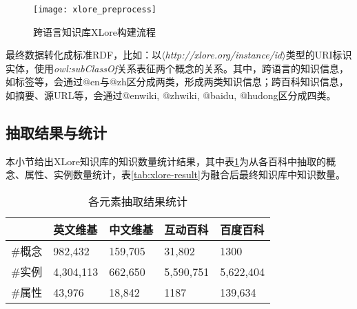 \begin{figure}[H]
  \centering
  \texttt{[image: xlore\_preprocess]}
  \caption{跨语言知识库XLore构建流程}
  \label{fig:xlore-preprocess}
\end{figure}

最终数据转化成标准RDF，比如：以$\langle$\emph{http://xlore.org/instance/id}$\rangle$类型的URI标识实体，使用\textit{owl:subClassOf}关系表征两个概念的关系。其中，跨语言的知识信息，如标签等，会通过@en与@zh区分成两类，形成两类知识信息；跨百科知识信息，如摘要、源URL等，会通过@enwiki, @zhwiki, @baidu, @hudong区分成四类。

\subsection{抽取结果与统计}
本小节给出XLore知识库的知识数量统计结果，其中表\ref{tab:extract-result}为从各百科中抽取的概念、属性、实例数量统计，表\ref{tab:xlore-result}为融合后最终知识库中知识数量。

\begin{table}[htb]
    \centering
  \begin{minipage}[t]{0.8\linewidth}
    \caption{各元素抽取结果统计}
    \label{tab:extract-result}
    \begin{tabularx}{\linewidth}{lXXXX}
        \toprule[1.5pt]
               & 英文维基    & 中文维基   & 互动百科    & 百度百科     \\ \midrule[1pt]
        \#概念 & 982,432   & 159,705  & 31,802    & 1300      \\
        \#实例 & 4,304,113 & 662,650  & 5,590,751 & 5,622,404 \\
        \#属性 & 43,976    & 18,842   & 1187      & 139,634   \\
        \bottomrule[1.5pt]
    \end{tabularx}
  \end{minipage}
\end{table}

